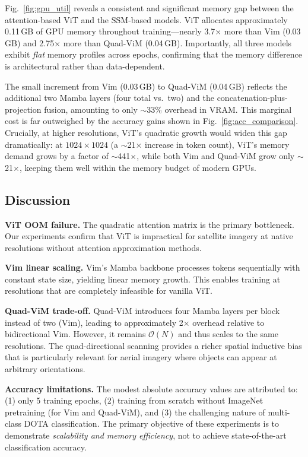 \documentclass[conference]{IEEEtran}
\begin{document}
Fig.~\ref{fig:gpu_util} reveals a consistent and significant memory gap between the attention-based ViT and the SSM-based models. ViT allocates approximately 0.11\,GB of GPU memory throughout training---nearly 3.7$\times$ more than Vim (0.03\,GB) and 2.75$\times$ more than Quad-ViM (0.04\,GB). Importantly, all three models exhibit \textit{flat} memory profiles across epochs, confirming that the memory difference is architectural rather than data-dependent.

The small increment from Vim (0.03\,GB) to Quad-ViM (0.04\,GB) reflects the additional two Mamba layers (four total vs.\ two) and the concatenation-plus-projection fusion, amounting to only $\sim$33\% overhead in VRAM. This marginal cost is far outweighed by the accuracy gains shown in Fig.~\ref{fig:acc_comparison}. Crucially, at higher resolutions, ViT's quadratic growth would widen this gap dramatically: at $1024 \times 1024$ (a $\sim$21$\times$ increase in token count), ViT's memory demand grows by a factor of $\sim$441$\times$, while both Vim and Quad-ViM grow only $\sim$21$\times$, keeping them well within the memory budget of modern GPUs.

\subsection{Discussion}

\textbf{ViT OOM failure.} The quadratic attention matrix is the primary bottleneck. Our experiments confirm that ViT is impractical for satellite imagery at native resolutions without attention approximation methods.

\textbf{Vim linear scaling.} Vim's Mamba backbone processes tokens sequentially with constant state size, yielding linear memory growth. This enables training at resolutions that are completely infeasible for vanilla ViT.

\textbf{Quad-ViM trade-off.} Quad-ViM introduces four Mamba layers per block instead of two (Vim), leading to approximately 2$\times$ overhead relative to bidirectional Vim. However, it remains $\mathcal{O}(N)$ and thus scales to the same resolutions. The quad-directional scanning provides a richer spatial inductive bias that is particularly relevant for aerial imagery where objects can appear at arbitrary orientations.

\textbf{Accuracy limitations.} The modest absolute accuracy values are attributed to: (1) only 5 training epochs, (2) training from scratch without ImageNet pretraining (for Vim and Quad-ViM), and (3) the challenging nature of multi-class DOTA classification. The primary objective of these experiments is to demonstrate \textit{scalability and memory efficiency}, not to achieve state-of-the-art classification accuracy.
\end{document}
